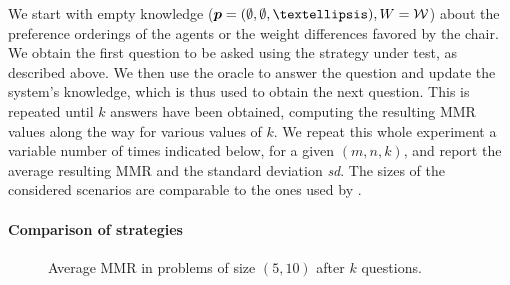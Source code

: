 \documentclass{article}
\begin{document}
We start with empty knowledge ($\pprofile = (\emptyset, \emptyset, …), W = \W$) about the preference orderings of the agents or the weight differences favored by the chair. We obtain the first question to be asked using the strategy under test, as described above. We then use the oracle to answer the question and update the system's knowledge, which is thus used to obtain the next question. This is repeated until $k$ answers have been obtained, computing the resulting MMR values along the way for various values of $k$. We repeat this whole experiment a variable number of times indicated below, for a given $(m, n, k)$, and report the average resulting MMR and the standard deviation \textit{sd}. The sizes of the considered scenarios are comparable to the ones used by \citet{Cailloux2014}. 

\paragraph{Comparison of strategies}
\begin{figure}[ht]
	\caption{Average MMR in problems of size $(5, 10)$ after $k$ questions.}
	\label{fig:smallSize}
\end{figure}
\end{document}
